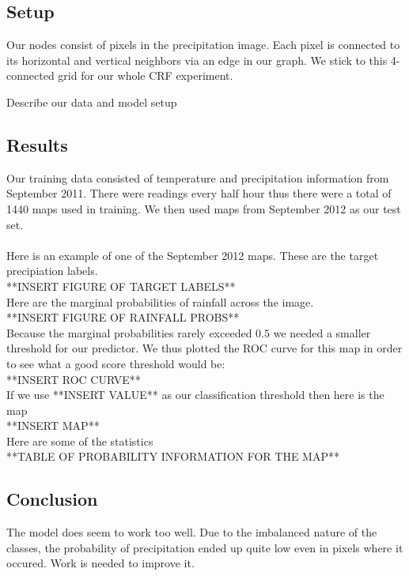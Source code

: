 \subsection{Setup}

Our nodes consist of pixels in the precipitation image. Each pixel is connected to its horizontal and vertical neighbors via an edge in our graph. We stick to this 4-connected grid for our whole CRF experiment. 

Describe our data and model setup

\subsection{Results}

Our training data consisted of temperature and precipitation information from September 2011. There were readings every half hour thus there were a total of 1440 maps used in training. We then used maps from September 2012 as our test set. \\
\\
Here is an example of one of the September 2012 maps. These are the target precipiation labels. \\
**INSERT FIGURE OF TARGET LABELS**\\
Here are the marginal probabilities of rainfall across the image.\\
**INSERT FIGURE OF RAINFALL PROBS**\\
Because the marginal probabilities rarely exceeded $0.5$ we needed a smaller threshold for our predictor. We thus plotted the ROC curve for this map in order to see what a good score threshold would be:\\
**INSERT ROC CURVE** \\
If we use **INSERT VALUE** as our classification threshold then here is the map\\
**INSERT MAP**\\
Here are some of the statistics \\
**TABLE OF PROBABILITY INFORMATION FOR THE MAP**

\subsection{Conclusion}

The model does seem to work too well. Due to the imbalanced nature of the classes, the probability of precipitation ended up quite low even in pixels where it occured. Work is needed to improve it. 


